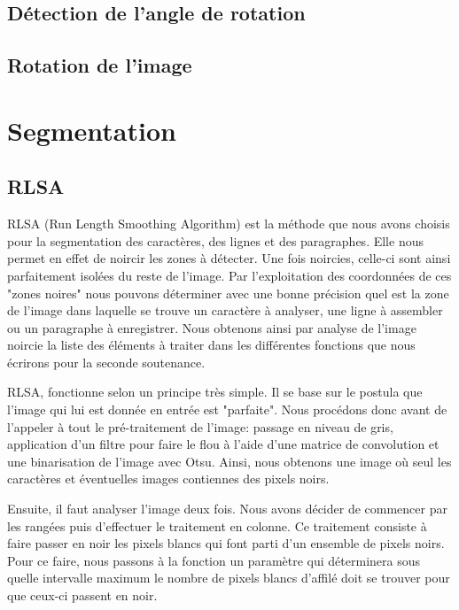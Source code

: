 \documentclass[11pt]{report}
\begin{document}
\subsection{Détection de l'angle de rotation}

\subsection{Rotation de l'image}

\section{Segmentation}

\subsection{RLSA}

RLSA (Run Length Smoothing Algorithm) est la méthode que nous avons choisis pour la segmentation des caractères, des lignes et des paragraphes. Elle nous permet en effet de noircir les zones à détecter. Une fois noircies, celle-ci sont ainsi parfaitement isolées du reste de l'image. Par l'exploitation des coordonnées de ces "zones noires" nous pouvons déterminer avec une bonne précision quel est la zone de l'image dans laquelle se trouve un caractère à analyser, une ligne à assembler ou un paragraphe à enregistrer. Nous obtenons ainsi par analyse de l'image noircie la liste des éléments à traiter dans les différentes fonctions que nous écrirons pour la seconde soutenance.

RLSA, fonctionne selon un principe très simple. Il se base sur le postula que l'image qui lui est donnée en entrée est "parfaite". Nous procédons donc avant de l'appeler à tout le pré-traitement de l'image: passage en niveau de gris, application d'un filtre pour faire le flou à l'aide d'une matrice de convolution et une binarisation de l'image avec Otsu. Ainsi, nous obtenons une image où seul les caractères et éventuelles images contiennes des pixels noirs.

Ensuite, il faut analyser l'image deux fois. Nous avons décider de commencer par les rangées puis d'effectuer le traitement en colonne. Ce traitement consiste à faire passer en noir les pixels blancs qui font parti d'un ensemble de pixels noirs. Pour ce faire, nous passons à la fonction un paramètre qui déterminera sous quelle intervalle maximum le nombre de pixels blancs d'affilé doit se trouver pour que ceux-ci passent en noir.
\end{document}
